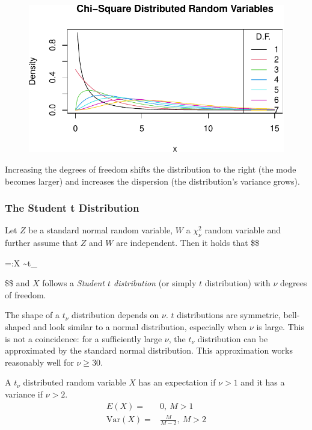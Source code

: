 \documentclass[
  letterpaper,
  DIV=11,
  numbers=noendperiod]{scrreprt}
\theoremstyle{definition}
\theoremstyle{plain}
\theoremstyle{plain}
\theoremstyle{remark}
\begin{document}
\begin{figure}[H]

{\centering \includegraphics{./02-Review-Prob_n_Stats_files/figure-pdf/unnamed-chunk-13-1.pdf}

}

\end{figure}

Increasing the degrees of freedom shifts the distribution to the right
(the mode becomes larger) and increases the dispersion (the
distribution's variance grows).

\hypertarget{the-student-t-distribution}{%
\subsubsection{The Student t
Distribution}\label{the-student-t-distribution}}

Let \(Z\) be a standard normal random variable, \(W\) a \(\chi^2_\nu\)
random variable and further assume that \(Z\) and \(W\) are independent.
Then it holds that \$\$

 =:X \sim t\_\nu

\$\$ and \(X\) follows a \emph{Student \(t\) distribution} (or simply
\(t\) distribution) with \(\nu\) degrees of freedom.

The shape of a \(t_\nu\) distribution depends on \(\nu\). \(t\)
distributions are symmetric, bell-shaped and look similar to a normal
distribution, especially when \(\nu\) is large. This is not a
coincidence: for a sufficiently large \(\nu\), the \(t_\nu\)
distribution can be approximated by the standard normal distribution.
This approximation works reasonably well for \(\nu\geq 30\).

A \(t_\nu\) distributed random variable \(X\) has an expectation if
\(\nu>1\) and it has a variance if \(\nu>2\). \begin{align*}
  E(X) =& 0, \ M>1 \\
  \text{Var}(X) =& \frac{M}{M-2}, \ M>2
\end{align*}
\end{document}
